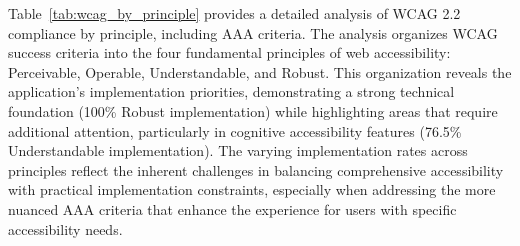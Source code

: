 Table~\ref{tab:wcag_by_principle} provides a detailed analysis of WCAG 2.2 compliance by principle, including AAA criteria. The analysis organizes WCAG success criteria into the four fundamental principles of web accessibility: Perceivable, Operable, Understandable, and Robust. This organization reveals the application's implementation priorities, demonstrating a strong technical foundation (100\% Robust implementation) while highlighting areas that require additional attention, particularly in cognitive accessibility features (76.5\% Understandable implementation). The varying implementation rates across principles reflect the inherent challenges in balancing comprehensive accessibility with practical implementation constraints, especially when addressing the more nuanced AAA criteria that enhance the experience for users with specific accessibility needs. 

